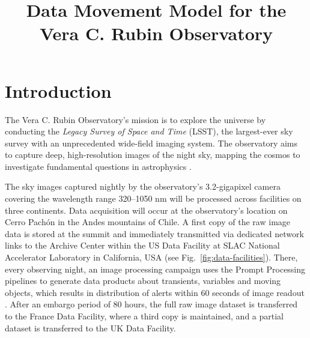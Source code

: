 \documentclass{webofc}
\begin{document}
\title{Data Movement Model for the Vera C. Rubin Observatory}




\maketitle

\section{Introduction}
\label{introduction}
The Vera C. Rubin Observatory's mission is to explore the universe by conducting the \textit{Legacy Survey of Space and Time} (LSST), the largest-ever sky survey with an unprecedented wide-field imaging system. The observatory aims to capture deep, high-resolution images of the night sky, mapping the cosmos to investigate fundamental questions in astrophysics \cite{Ivezic:2019}.

The sky images captured nightly by the observatory's 3.2-gigapixel camera covering the wavelength range 320--1050 nm will be processed across facilities on three continents. Data acquisition will occur at the observatory's location on Cerro Pachón in the Andes mountains of Chile. A first copy of the raw image data is stored at the summit and immediately transmitted via dedicated network links to the Archive Center within the US Data Facility at SLAC National Accelerator Laboratory in California, USA (see Fig.\ \ref{fig:data-facilities}). There, every observing night, an image processing campaign uses the Prompt Processing pipelines to generate data products about transients, variables and moving objects, which results in distribution of alerts within 60 seconds of image readout \cite{LSE-163,melissa_graham_2022_7011229}. After an embargo period of 80 hours, the full raw image dataset is transferred to the France Data Facility, where a third copy is maintained, and a partial dataset is transferred to the UK Data Facility.
\end{document}
